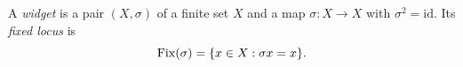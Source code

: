 
\begin{definition}[Widget]\label{dm-0001}\label{def:widget}
A \emph{widget} is a pair $(X,\sigma)$ of a finite set $X$ and a map $\sigma\colon X\to X$ with $\sigma^2=\mathrm{id}$. Its \emph{fixed locus} is
\begin{equation}\label{eq:fix}
\operatorname{Fix}(\sigma) = \{x\in X : \sigma x = x\}.
\end{equation}
\end{definition}
